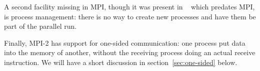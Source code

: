 A second facility missing in MPI, though it was present in
~\cite{pvm-1,pvm-2} which predates MPI, is process
management: there is no way to create new processes and have them be
part of the parallel run.

Finally, MPI-2 has support for one-sided communication: one process
put data into the memory of another, without the receiving process
doing an actual receive instruction. We will have a short discussion
in section~\ref{sec:one-sided} below.


